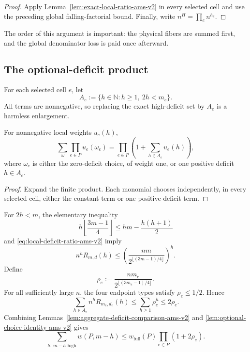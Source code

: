 \begin{proof}
Apply Lemma~\ref{lem:exact-local-ratio-ams-v2} in every selected cell and use
the preceding global falling-factorial bound.  Finally, write
$n^H=\prod_e n^{h_e}$.
\end{proof}

The order of this argument is important: the physical fibers are summed first,
and the global denominator loss is paid once afterward.

\subsection{The optional-deficit product}

For each selected cell $e$, let
\[
  A_e:=\{h\in\mathbb N: h\ge1,\ 2h<m_e\}.
\]
All terms are nonnegative, so replacing the exact high-deficit set by $A_e$ is
a harmless enlargement.

\begin{lemma}
\label{lem:optional-choice-identity-ams-v2}
For nonnegative local weights $u_e(h)$,
\[
  \sum_{\omega}
    \prod_{e\in P}u_e(\omega_e)
  =
  \prod_{e\in P}
    \left(1+\sum_{h\in A_e}u_e(h)\right),
\]
where $\omega_e$ is either the zero-deficit choice, of weight one, or one
positive deficit $h\in A_e$.
\end{lemma}

\begin{proof}
Expand the finite product.  Each monomial chooses independently, in every
selected cell, either the constant term or one positive-deficit term.
\end{proof}

For $2h<m$, the elementary inequality
\[
  h\left\lfloor\frac{3m-1}{4}\right\rfloor
  \le
  hm-\frac{h(h+1)}2
\]
and \eqref{eq:local-deficit-ratio-ams-v2} imply
\begin{equation}
  n^hR_{m,d}(h)
  \le
  \left(
    \frac{nm}{2^{\lfloor(3m-1)/4\rfloor}}
  \right)^h.
  \label{eq:three-quarter-charge-ams-v2}
\end{equation}
Define
\[
  \rho_e:=
  \frac{nm_e}{2^{\lfloor(3m_e-1)/4\rfloor}}.
\]
For all sufficiently large $n$, the four endpoint types satisfy
$\rho_e\le1/2$.  Hence
\[
  \sum_{h\in A_e}n^hR_{m_e,d_e}(h)
  \le
  \sum_{h\ge1}\rho_e^h
  \le 2\rho_e.
\]
Combining Lemmas~\ref{lem:aggregate-deficit-comparison-ams-v2} and
\ref{lem:optional-choice-identity-ams-v2} gives
\begin{equation}
  \sum_{h:\,m-h\text{ high}}w(P,m-h)
  \le
  w_{\mathrm{full}}(P)
  \prod_{e\in P}(1+2\rho_e).
  \label{eq:fixed-support-deficit-bound-ams-v2}
\end{equation}

